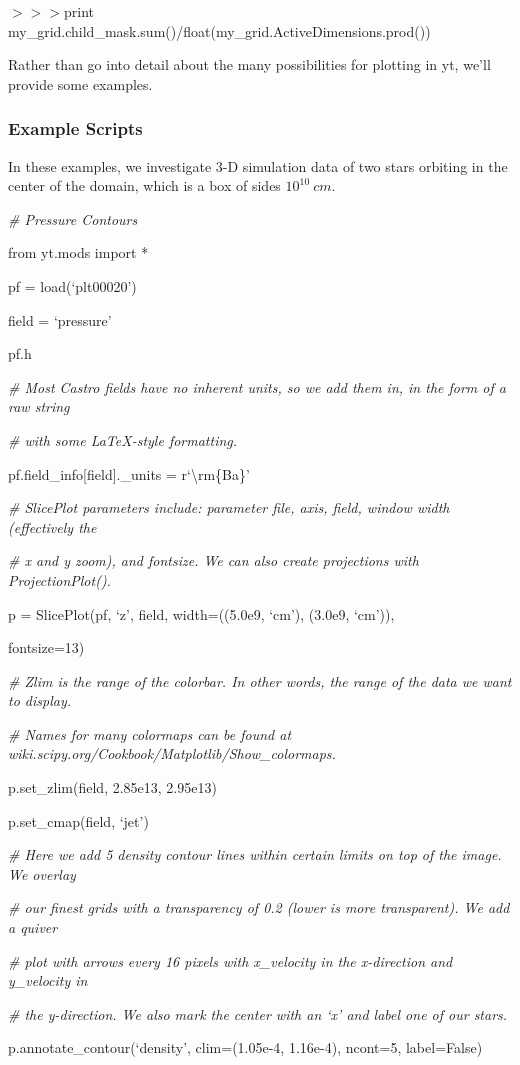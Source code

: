 {\scriptsize$>>>$}print my\_grid.child\_mask.sum()/float(my\_grid.ActiveDimensions.prod())

Rather than go into detail about the many possibilities for plotting in yt, we'll provide some examples.

\subsubsection{Example Scripts}

In these examples, we investigate 3-D simulation data of two stars orbiting in the center of the domain, which is a box of sides $10^{10}\:cm$.


{\it\# Pressure Contours}
{\setlength{\parskip}{0pt}

from yt.mods import *
}

pf = load(`plt00020')

field = `pressure'

pf.h

{\it\# Most Castro fields have no inherent units, so we add them in, in the form of a raw string}
{\setlength{\parskip}{0pt}

{\it\# with some LaTeX-style formatting.}

pf.field\_info[field].\_units = r`\textbackslash rm\{Ba\}'
}


{\it\# SlicePlot parameters include: parameter file, axis, field, window width (effectively the}
{\setlength{\parskip}{0pt}

{\it\# x and y zoom), and fontsize. We can also create projections with ProjectionPlot().}

p = SlicePlot(pf, `z', field, width=((5.0e9, `cm'), (3.0e9, `cm')),

{\setlength{\parindent}{68pt}fontsize=13)}
}

{\it\# Zlim is the range of the colorbar. In other words, the range of the data we want to display.}
{\setlength{\parskip}{0pt}

{\it\# Names for many colormaps can be found at wiki.scipy.org/Cookbook/Matplotlib/Show\_colormaps.}

p.set\_zlim(field, 2.85e13, 2.95e13)
}

p.set\_cmap(field, `jet')

{\it\# Here we add 5 density contour lines within certain limits on top of the image. We overlay}
{\setlength{\parskip}{0pt}

{\it\# our finest grids with a transparency of 0.2 (lower is more transparent). We add a quiver}

{\it\# plot with arrows every 16 pixels with x\_velocity in the x-direction and y\_velocity in}

{\it\# the y-direction. We also mark the center with an `x' and label one of our stars.}

p.annotate\_contour(`density', clim=(1.05e-4, 1.16e-4), ncont=5, label=False)
}

